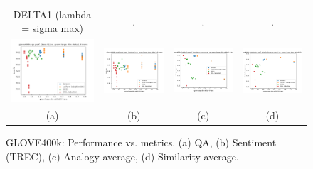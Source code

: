 \begin{figure}
\begin{tabular}{@{\hskip -0.0in}c@{\hskip -0.0in}c@{\hskip -0.0in}c@{\hskip -0.0in}c@{\hskip -0.0in}}
		DELTA1 (lambda = sigma max) & . & . & . \\
		\includegraphics[width=.245\linewidth]{figures/glove400k_qa_best-f1_vs_gram-large-dim-delta1-6-trans_linx.pdf} &
		\includegraphics[width=.245\linewidth]{figures/glove400k_sentiment_trec_test-acc_vs_gram-large-dim-delta1-6-trans_linx.pdf} &
		\includegraphics[width=.245\linewidth]{figures/glove400k_intrinsics_analogy-avg-score_vs_gram-large-dim-delta1-6-trans_linx.pdf} &
		\includegraphics[width=.245\linewidth]{figures/glove400k_intrinsics_similarity-avg-score_vs_gram-large-dim-delta1-6-trans_linx.pdf} \\		
		
		\;\;\;\;\;(a) & \;\;\;\;\;\;(b) & \;\;\;\;\;\;(c) & \;\;\;\;\;\;(d)
	\end{tabular}
	\caption{GLOVE400k: Performance vs. metrics. (a) QA, (b) Sentiment (TREC), (c) Analogy average, (d) Similarity average.
	}
	\label{fig:glove400k_comparison_results}
\end{figure}


